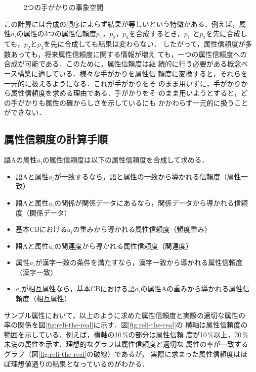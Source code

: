 \begin{figure}[ht]
  \begin{center}
    \caption{2つの手がかりの事象空間}
    \label{fig:two_reli}
  \end{center}
\end{figure}

この計算には合成の順序によらず結果が等しいという特徴がある．例えば，属
性$a_i$の属性の3つの属性信頼度$p_1$，$p_2$，$p_3$を合成するとき，$p_1$
と$p_2$を先に合成しても，$p_2$と$p_3$を先に合成しても結果は変わらない．
したがって，属性信頼度が多数あっても，将来属性信頼度に関する情報が増え
ても，一つの属性信頼度への合成が可能である．このために，属性信頼度は継
続的に行う必要がある概念ベース構築に適している．様々な手がかりを属性信
頼度に変換すると，それらを一元的に扱えるようになる．これが手がかりをそ
のまま用いずに，手がかりから属性信頼度を求める理由である．手がかりをそ
のまま用いようとすると，どの手がかりも属性の確からしさを示しているにも
かかわらず一元的に扱うことができない．

\subsection{属性信頼度の計算手順}

語Aの属性$a_i$の属性信頼度は以下の属性信頼度を合成して求める．

\begin{itemize}
\item 語Aと属性$a_i$が一致するなら，語と属性の一致から導かれる信頼度（属性一致）
\item 語Aと属性$a_i$の関係が関係データにあるなら，関係データから導かれる信頼度（関係データ）
\item 基本CBにおける$a_i$の重みから導かれる属性信頼度（頻度重み）
\item 語Aと属性$a_i$の関連度から導かれる属性信頼度（関連度）
\item 属性$a_i$が漢字一致の条件を満たすなら，漢字一致から導かれる属性信頼度（漢字一致）
\item $a_i$が相互属性なら，基本CBにおける語$a_i$の属性Aの重みから導かれる属性信頼度（相互属性）
\end{itemize}

サンプル属性において，以上のように求めた属性信頼度と実際の適切な属性の
率の関係を図\ref{fig:reli-the-real}に示す．図\ref{fig:reli-the-real}の
横軸は属性信頼度の範囲を示している．例えば，横軸の10\,\%の部分は属性信頼
度が10\,\%以上，20\,\%未満の属性を示す．理想的なグラフは属性信頼度と適切な
属性の率が一致するグラフ（図\ref{fig:reli-the-real}の破線）であるが，
実際に求まった属性信頼度はほぼ理想値通りの結果となっているのがわかる．

